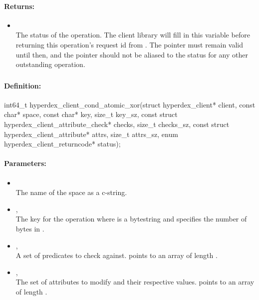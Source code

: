 \paragraph{Returns:}
\begin{itemize}[noitemsep]
\item {}\\
The status of the operation.  The client library will fill in this variable before returning this operation's request id from .  The pointer must remain valid until then, and the pointer should not be aliased to the status for any other outstanding operation.
\end{itemize}

\pagebreak
\subsubsection{}
\label{api:c:cond_atomic_xor}


\paragraph{Definition:}
\begin{ccode}
int64_t hyperdex_client_cond_atomic_xor(struct hyperdex_client* client,
        const char* space,
        const char* key, size_t key_sz,
        const struct hyperdex_client_attribute_check* checks, size_t checks_sz,
        const struct hyperdex_client_attribute* attrs, size_t attrs_sz,
        enum hyperdex_client_returncode* status);
\end{ccode}

\paragraph{Parameters:}
\begin{itemize}[noitemsep]
\item {}\\
The name of the space as a c-string.
\item {}, \\
The key for the operation where  is a bytestring and  specifies the number of bytes in .
\item {}, \\
A set of predicates to check against.   points to an array of length .
\item {}, \\
The set of attributes to modify and their respective values.   points to an array of length .
\end{itemize}

